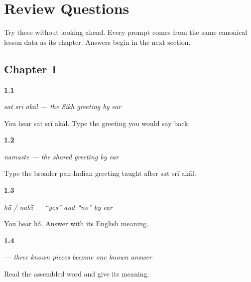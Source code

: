 
\chapter*{Review Questions}

Try these without looking ahead. Every prompt comes from the same canonical lesson data as its chapter. Answers begin in the next section.

\section*{Chapter 1}

\noindent\begin{minipage}[t]{\linewidth}
\raggedright
\hypertarget{review-PA-C01-sat-sri-akal-return}{\textbf{1.1}} \emph{\emph{sat srī akāl} — the Sikh greeting by ear}\par
\small You hear sat srī akāl. Type the greeting you would say back.
\end{minipage}\par\medskip

\noindent\begin{minipage}[t]{\linewidth}
\raggedright
\hypertarget{review-PA-C01-namaste-context}{\textbf{1.2}} \emph{\emph{namaste} — the shared greeting by ear}\par
\small Type the broader pan-Indian greeting taught after sat srī akāl.
\end{minipage}\par\medskip

\noindent\begin{minipage}[t]{\linewidth}
\raggedright
\hypertarget{review-PA-C01-han-nahin-heard-meaning}{\textbf{1.3}} \emph{\emph{hā̃} / \emph{nahī̃} — “yes” and “no” by ear}\par
\small You hear hā̃. Answer with its English meaning.
\end{minipage}\par\medskip

\noindent\begin{minipage}[t]{\linewidth}
\raggedright
\hypertarget{review-PA-W01-haan-assemble-read}{\textbf{1.4}} \emph{ — three known pieces become one known answer}\par
\small Read the assembled word  and give its meaning.
\end{minipage}\par\medskip

